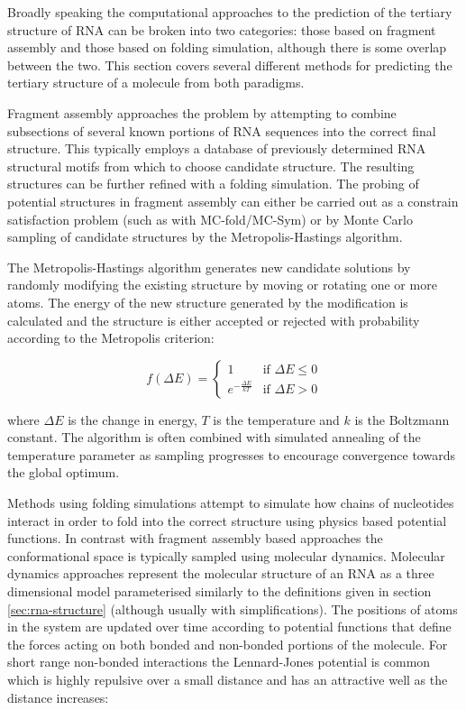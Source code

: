 \documentclass[journal]{IEEEtran}
\begin{document}
Broadly speaking the computational approaches to the prediction of the tertiary structure of RNA can be broken into two categories: those based on fragment assembly and those based on folding simulation, although there is some overlap between the two. This section covers several different methods for predicting the tertiary structure of a molecule from both paradigms.

Fragment assembly approaches the problem by attempting to combine subsections of several known portions of RNA sequences into the correct final structure. This typically employs a database of previously determined RNA structural motifs from which to choose candidate structure. The resulting structures can be further refined with a folding simulation. The probing of potential structures in fragment assembly can either be carried out as a constrain satisfaction problem (such as with MC-fold/MC-Sym\cite{parisien2008mc}) or by Monte Carlo sampling of candidate structures by the Metropolis-Hastings algorithm. 

The Metropolis-Hastings algorithm generates new candidate solutions by randomly modifying the existing structure by moving or rotating one or more atoms. The energy of the new structure generated by the modification is calculated and the structure is either accepted or rejected with probability according to the Metropolis criterion:

\begin{equation}
\label{eq:metropolis-criterion}
f(\Delta E) = 
  \begin{cases} 
    1 & \text{if } \Delta E \leq 0 \\
    e^{-\frac{\Delta E}{kT}} & \text{if } \Delta E > 0
  \end{cases}
\end{equation}

where $\Delta E$ is the change in energy, $T$ is the temperature and $k$ is the Boltzmann constant. The algorithm is often combined with simulated annealing of the temperature parameter as sampling progresses to encourage convergence towards the global optimum. 

Methods using folding simulations attempt to simulate how chains of nucleotides interact in order to fold into the correct structure using physics based potential functions. In contrast with fragment assembly based approaches the conformational space is typically sampled using molecular dynamics. Molecular dynamics approaches represent the molecular structure of an RNA as a three dimensional model parameterised similarly to the definitions given in section \ref{sec:rna-structure} (although usually with simplifications). The positions of atoms in the system are updated over time according to potential functions that define the forces acting on both bonded and non-bonded portions of the molecule. For short range non-bonded interactions the Lennard-Jones potential is common which is highly repulsive over a small distance and has an attractive well as the distance increases:
\end{document}
